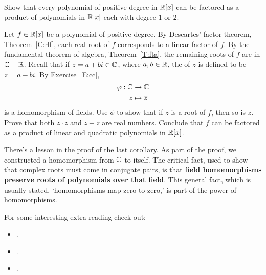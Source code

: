 \documentclass{ximera}
\begin{document}
\begin{corollary}\label{C:RQ} 
Show that every polynomial of positive degree in $\mathbb R[x]$ can be
factored as a product of polynomials in $\mathbb R[x]$ each with degree $1$
or $2$.
\begin{sketch}
  Let $f\in \mathbb R[x]$ be a polynomial of positive degree.  By Descartes'
  factor theorem, Theorem~\ref{C:rlf}, each real root of $f$
  corresponds to a linear factor of $f$. By the fundamental theorem of
  algebra, Theorem~\ref{T:fta}, the remaining roots of $f$ are in
  $\mathbb C-\mathbb R$.  Recall that if $z=a+bi\in\mathbb C$, where $a,b\in\mathbb R$, the
   of $z$ is defined to be $\bar{z} = a - bi$.
  By Exercise~\ref{E:cc},
  \begin{align*}
    \varphi:\mathbb C&\to\mathbb C\\
    z &\mapsto \overline{z}
  \end{align*}
  is a homomorphism of fields.  Use $\phi$ to show that if $z$ is a
  root of $f$, then so is $\bar{z}$.  Prove that both $z\cdot \bar{z}$
  and $z+\bar{z}$ are real numbers.  Conclude that $f$ can be factored
  as a product of linear and quadratic polynomials in $\mathbb R[x]$.
\end{sketch}
\end{corollary}

There's a lesson in the proof of the last corollary. As part of the
proof, we constructed a homomorphism from $\mathbb C$ to itself. The critical
fact, used to show that complex roots must come in conjugate pairs, is
that \textbf{field homomorphisms preserve roots of polynomials over
  that field}. This general fact, which is usually stated,
`homomorphisms map zero to zero,' is part of the power of
homomorphisms.




For some interesting extra reading check out:
\begin{itemize}
\item {}.
\item {}.
\item {}.
\end{itemize}
\end{document}
